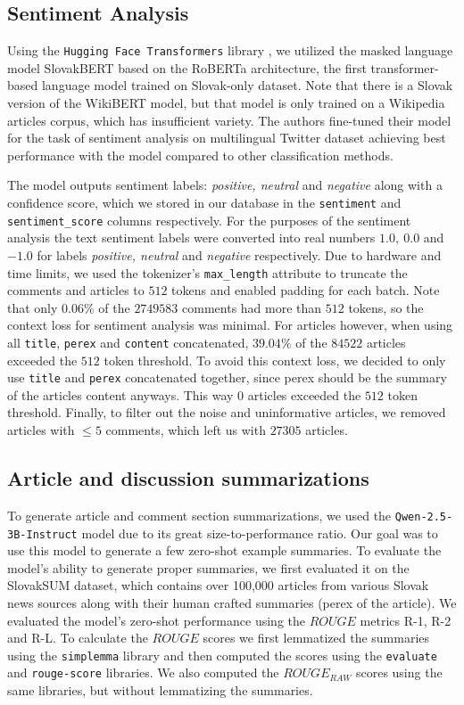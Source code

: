 \documentclass[11pt,a4paper]{article}
\begin{document}
\subsection{Sentiment Analysis}
Using the \texttt{Hugging Face Transformers} library \cite{Wolf2020}, we utilized the masked language model SlovakBERT \cite{Pikuliak2022} based on the RoBERTa architecture, the first transformer-based language model trained on Slovak-only dataset. Note that there is a Slovak version of the WikiBERT model, but that model is only trained on a Wikipedia articles corpus, which has insufficient variety. The authors fine-tuned their model for the task of sentiment analysis on multilingual Twitter dataset \cite{Mozetic2016} achieving best performance with the model compared to other classification methods.

The model outputs sentiment labels: \textit{positive, neutral} and \textit{negative} along with a confidence score, which we stored in our database in the \texttt{sentiment} and \texttt{sentiment\_score} columns respectively. For the purposes of the sentiment analysis the text sentiment labels were converted into real numbers $1.0,\ 0.0$ and $-1.0$ for labels \textit{positive, neutral} and \textit{negative} respectively. Due to hardware and time limits, we used the tokenizer's \texttt{max\_length} attribute to truncate the comments and articles to $512$ tokens and enabled padding for each batch. Note that only $0.06\%$ of the $2749583$ comments had more than $512$ tokens, so the context loss for sentiment analysis was minimal. For articles however, when using all \texttt{title}, \texttt{perex} and \texttt{content} concatenated, $39.04\%$ of the $84522$ articles exceeded the $512$ token threshold. To avoid this context loss, we decided to only use \texttt{title} and \texttt{perex} concatenated together, since perex should be the summary of the articles content anyways. This way $0$ articles exceeded the $512$ token threshold. Finally, to filter out the noise and uninformative articles, we removed articles with $\leq 5$ comments, which left us with $27305$ articles.

\subsection{Article and discussion summarizations}
To generate article and comment section summarizations, we used the \texttt{Qwen-2.5-3B-Instruct} \cite{Yang2024} model due to its great size-to-performance ratio. Our goal was to use this model to generate a few zero-shot example summaries. To evaluate the model's ability to generate proper summaries, we first evaluated it on the SlovakSUM \cite{Ondrejova2024} dataset, which contains over 100,000 articles from various Slovak news sources along with their human crafted summaries (perex of the article). We evaluated the model's zero-shot performance using the $ROUGE$ metrics \cite{Lin2004} R-1, R-2 and R-L. To calculate the $ROUGE$ scores we first lemmatized the summaries using the \texttt{simplemma} library \cite{Barbaresi2024} and then computed the scores using the \texttt{evaluate} and \texttt{rouge-score} libraries. We also computed the $ROUGE_{RAW}$ scores using the same libraries, but without lemmatizing the summaries.
\end{document}
